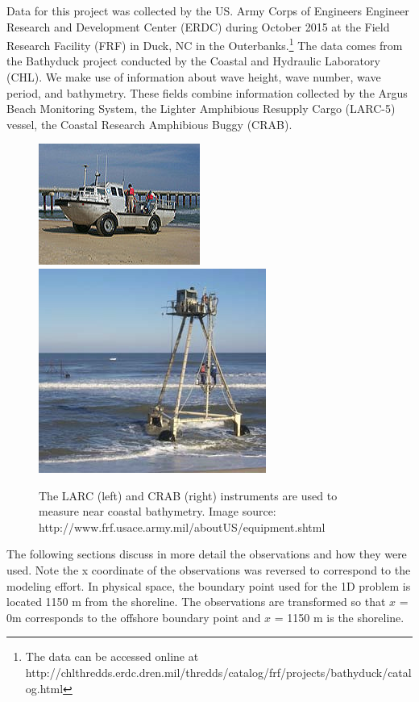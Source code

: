 Data for this project was collected by the US. Army Corps of Engineers Engineer Research and Development Center (ERDC) during October 2015 at the Field Research Facility (FRF) in Duck, NC in the Outerbanks.\footnote{The data can be accessed online at http://chlthredds.erdc.dren.mil/thredds/catalog/frf/projects/bathyduck/catalog.html} The data comes from the Bathyduck project conducted by the Coastal and Hydraulic Laboratory (CHL). We make use of information about wave height, wave number, wave period, and bathymetry. These fields combine information collected by the Argus Beach Monitoring System, the Lighter Amphibious Resupply Cargo (LARC-5) vessel, the Coastal Research Amphibious Buggy (CRAB). 

\begin{figure}[h]
\includegraphics[width=.48\linewidth]{img/LARC.jpg}\hfill
\includegraphics[width=.48\linewidth]{img/CRAB2.jpg}
\caption{The LARC (left) and CRAB (right) instruments are used to measure near coastal bathymetry. Image source: http://www.frf.usace.army.mil/aboutUS/equipment.shtml}
\end{figure}

The following sections discuss in more detail the observations and how they were used. Note the x coordinate of the observations was reversed to correspond to the modeling effort. In physical space, the boundary point used for the 1D problem is located 1150 m from the shoreline. The observations are transformed so that $\textit{x}$ = 0m corresponds to the offshore boundary point and $\textit{x}$ = 1150 m is the shoreline. 

